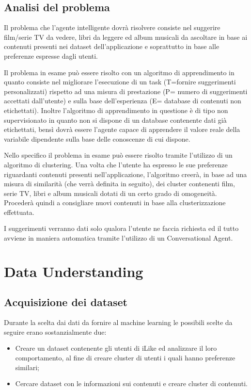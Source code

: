 \documentclass[a4paper, 12pt]{report}
\begin{document}
        \section{Analisi del problema}\label{sec:analisi-del-problema}
            Il problema che l’agente intelligente dovrà risolvere consiste nel suggerire film/serie TV da vedere,
            libri da leggere ed album musicali da ascoltare in base ai contenuti presenti nei dataset dell’applicazione
            e soprattutto in base alle preferenze espresse dagli utenti.

            Il problema in esame può essere risolto con un algoritmo di apprendimento in quanto consiste nel migliorare
            l’esecuzione di un task (T=fornire suggerimenti personalizzati) rispetto ad una misura di prestazione
            (P= numero di suggerimenti accettati dall’utente) e sulla base dell’esperienza (E= database di contenuti non
            etichettati).
            Inoltre l’algoritmo di apprendimento in questione è di tipo non supervisionato in quanto non si dispone di un
            database contenente dati già etichettati, bensì dovrà essere l’agente capace di apprendere il valore reale
            della variabile dipendente sulla base delle conoscenze di cui dispone.

            Nello specifico il problema in esame può essere risolto tramite l’utilizzo di un algoritmo di clustering.
            Una volta che l’utente ha espresso le sue preferenze riguardanti contenuti presenti nell’applicazione, l’algoritmo
            creerà, in base ad una misura di similarità (che verrà definita in seguito), dei cluster contenenti film, serie TV,
            libri e album musicali dotati di un certo grado di omogeneità.
            Procederà quindi a consigliare nuovi contenuti in base alla clusterizzazione effettuata.

            I suggerimenti verranno dati solo qualora l’utente ne faccia richiesta ed il tutto avviene in maniera
            automatica tramite l’utilizzo di un Conversational Agent.

    \chapter{Data Understanding}\label{ch:data-understanding}

        \section{Acquisizione dei dataset}\label{sec:acquisizione-dei-dataset}
            Durante la scelta dai dati da fornire al machine learning le possibili scelte da seguire erano sostanzialmente due:
            \begin{itemize}
                \item Creare un dataset contenente gli utenti di iLike ed analizzare il loro comportamento, al fine di creare
                      cluster di utenti i quali hanno preferenze similari;
                \item Cercare dataset con le informazioni sui contenuti e creare cluster di contenuti.
            \end{itemize}
\end{document}
